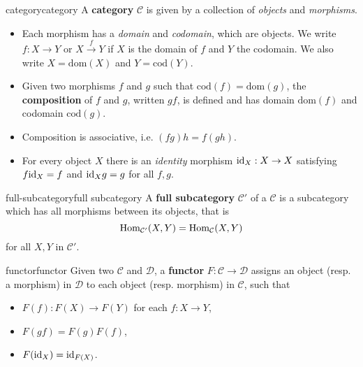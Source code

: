 \begin{topic}{category}{category}
    A \textbf{category} $\mathcal{C}$ is given by a collection of \textit{objects} and \textit{morphisms}.
    \begin{itemize}
        \item Each morphism has a \textit{domain} and \textit{codomain}, which are objects. We write $f : X \to Y$ or $X \overset{f}{\to} Y$ if $X$ is the domain of $f$ and $Y$ the codomain. We also write $X = \text{dom}(X)$ and $Y = \text{cod}(Y)$.
        
        \item Given two morphisms $f$ and $g$ such that $\text{cod}(f) = \text{dom}(g)$, the \textbf{composition} of $f$ and $g$, written $gf$, is defined and has domain $\text{dom}(f)$ and codomain $\text{cod}(g)$.
        
        \item Composition is associative, i.e. $(fg)h = f(gh)$.
        
        \item For every object $X$ there is an \textit{identity} morphism $\text{id}_X : X \to X$ satisfying $f \text{id}_X = f$ and $\text{id}_X g = g$ for all $f, g$.
    \end{itemize}
\end{topic}

\begin{topic}{full-subcategory}{full subcategory}
    A \textbf{full subcategory} $\mathcal{C}'$ of a  $\mathcal{C}$ is a subcategory which has all morphisms between its objects, that is
    \[ \text{Hom}_{\mathcal{C}'}(X, Y) = \text{Hom}_{\mathcal{C}}(X, Y) \]
    for all $X, Y$ in $\mathcal{C}'$.
\end{topic}

\begin{topic}{functor}{functor}
    Given two  $\mathcal{C}$ and $\mathcal{D}$, a \textbf{functor} $F : \mathcal{C} \to \mathcal{D}$ assigns an object (resp. a morphism) in $\mathcal{D}$ to each object (resp. morphism) in $\mathcal{C}$, such that
    \begin{itemize}
        \item $F(f) : F(X) \to F(Y)$ for each $f : X \to Y$,
        \item $F(gf) = F(g) F(f)$,
        \item $F(\text{id}_X) = \text{id}_{F(X)}$.
    \end{itemize}
\end{topic}

